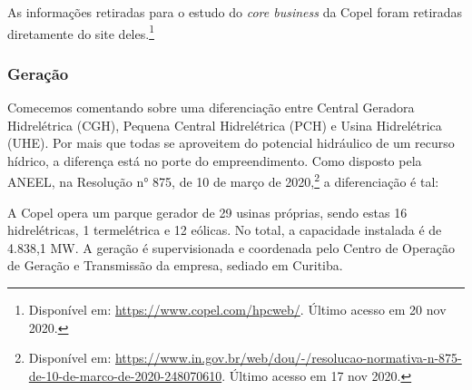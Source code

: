 \documentclass[grad,numbers]{coppe}
\begin{document}
  As informações retiradas para o estudo do \emph{core business} da Copel foram retiradas diretamente do site deles.\footnote{Disponível em: \url{https://www.copel.com/hpcweb/}. Último acesso em 20 nov 2020.}

  \hypertarget{gerauxe7uxe3o}{%
  \subsubsection{Geração}\label{gerauxe7uxe3o}}

  Comecemos comentando sobre uma diferenciação entre Central Geradora Hidrelétrica (CGH), Pequena Central Hidrelétrica (PCH) e Usina Hidrelétrica (UHE). Por mais que todas se aproveitem do potencial hidráulico de um recurso hídrico, a diferença está no porte do empreendimento. Como disposto pela ANEEL, na Resolução n° 875, de 10 de março de 2020,\footnote{Disponível em: \url{https://www.in.gov.br/web/dou/-/resolucao-normativa-n-875-de-10-de-marco-de-2020-248070610}. Último acesso em 17 nov 2020.} a diferenciação é tal:

  A Copel opera um parque gerador de 29 usinas próprias, sendo estas 16 hidrelétricas, 1 termelétrica e 12 eólicas. No total, a capacidade instalada é de 4.838,1 MW. A geração é supervisionada e coordenada pelo Centro de Operação de Geração e Transmissão da empresa, sediado em Curitiba.
\end{document}
